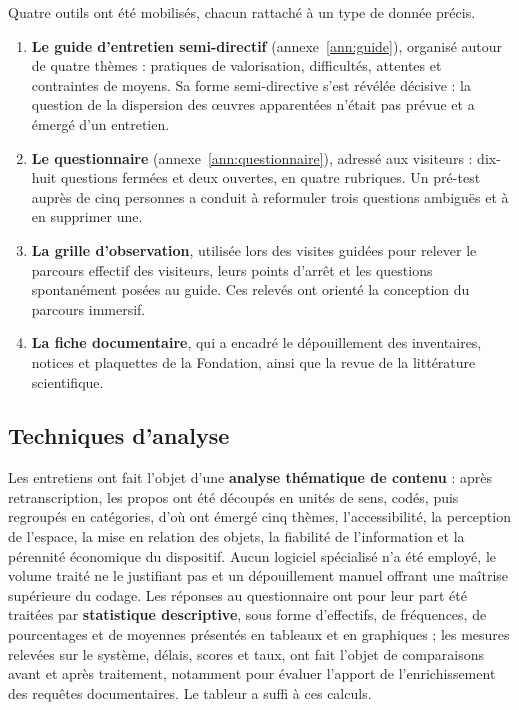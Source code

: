 Quatre outils ont été mobilisés, chacun rattaché à un type de donnée précis.

\begin{enumerate}
  \item \textbf{Le guide d'entretien semi-directif} (annexe~\ref{ann:guide}),
        organisé autour de quatre thèmes : pratiques de valorisation,
        difficultés, attentes et contraintes de moyens. Sa forme semi-directive
        s'est révélée décisive : la question de la dispersion des œuvres
        apparentées n'était pas prévue et a émergé d'un entretien.

  \item \textbf{Le questionnaire} (annexe~\ref{ann:questionnaire}), adressé aux
        visiteurs : dix-huit questions fermées et deux ouvertes, en quatre
        rubriques. Un pré-test auprès de cinq personnes a conduit à reformuler
        trois questions ambiguës et à en supprimer une.

  \item \textbf{La grille d'observation}, utilisée lors des visites guidées pour
        relever le parcours effectif des visiteurs, leurs points d'arrêt et les
        questions spontanément posées au guide. Ces relevés ont orienté la
        conception du parcours immersif.

  \item \textbf{La fiche documentaire}, qui a encadré le dépouillement des
        inventaires, notices et plaquettes de la Fondation, ainsi que la revue
        de la littérature scientifique.
\end{enumerate}

\subsection{Techniques d'analyse}

Les entretiens ont fait l'objet d'une \textbf{analyse thématique de contenu} :
après retranscription, les propos ont été découpés en unités de sens, codés,
puis regroupés en catégories, d'où ont émergé cinq thèmes, l'accessibilité, la
perception de l'espace, la mise en relation des objets, la fiabilité de
l'information et la pérennité économique du dispositif. Aucun logiciel
spécialisé n'a été employé, le volume traité ne le justifiant pas et un
dépouillement manuel offrant une maîtrise supérieure du codage. Les réponses au
questionnaire ont pour leur part été traitées par \textbf{statistique
descriptive}, sous forme d'effectifs, de fréquences, de pourcentages et de
moyennes présentés en tableaux et en graphiques ; les mesures relevées sur le
système, délais, scores et taux, ont fait l'objet de comparaisons avant et après
traitement, notamment pour évaluer l'apport de l'enrichissement des requêtes
documentaires. Le tableur a suffi à ces calculs.

